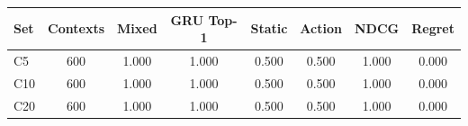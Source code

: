 \begin{tabular}{lccccccc}
\toprule
Set & Contexts & Mixed & GRU Top-1 & Static & Action & NDCG & Regret \\
\midrule
C5 & 600 & 1.000 & 1.000 & 0.500 & 0.500 & 1.000 & 0.000 \\
C10 & 600 & 1.000 & 1.000 & 0.500 & 0.500 & 1.000 & 0.000 \\
C20 & 600 & 1.000 & 1.000 & 0.500 & 0.500 & 1.000 & 0.000 \\
\bottomrule
\end{tabular}
